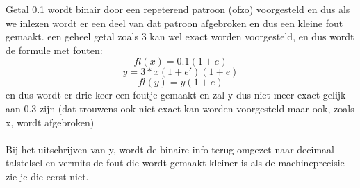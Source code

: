 Getal 0.1 wordt binair door een repeterend patroon (ofzo) voorgesteld en dus als we inlezen wordt er een deel van dat patroon afgebroken en dus een kleine fout gemaakt. een geheel getal zoals 3 kan wel exact worden voorgesteld, en dus wordt de formule met fouten:
\[
fl(x) = 0.1(1+e)
\]
\[
y= 3*x(1+e')(1+e)
\]
\[
fl(y) = y(1+e)
\]
en dus wordt er drie keer een foutje gemaakt en zal y dus niet meer exact gelijk aan 0.3 zijn (dat trouwens ook niet exact kan worden voorgesteld maar ook, zoals x, wordt afgebroken)\\
\\
Bij het uitschrijven van y, wordt de binaire info terug omgezet naar decimaal talstelsel en vermits de fout die wordt gemaakt kleiner is als de machineprecisie zie je die eerst niet.